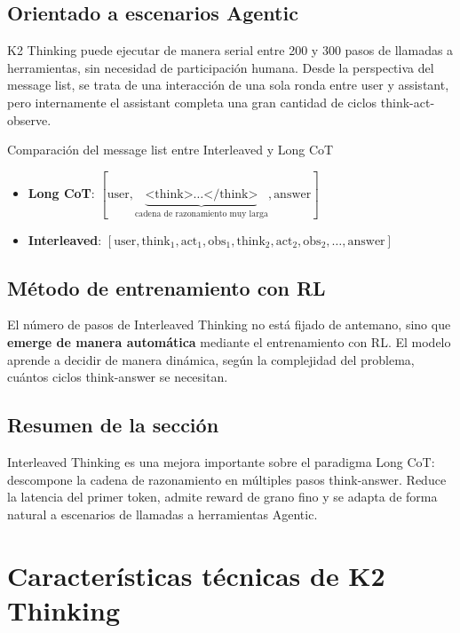\documentclass[a4paper]{article}
\begin{document}
\subsection{Orientado a escenarios Agentic}

K2 Thinking puede ejecutar de manera serial entre 200 y 300 pasos de llamadas a herramientas, sin necesidad de participación humana. Desde la perspectiva del message list, se trata de una interacción de una sola ronda entre user y assistant, pero internamente el assistant completa una gran cantidad de ciclos think-act-observe.

\begin{knowledgebox}{Comparación del message list entre Interleaved y Long CoT}
\begin{itemize}
  \item \textbf{Long CoT}: $[\text{user}, \underbrace{\text{<think>}\ldots\text{</think>}}_{\text{cadena de razonamiento muy larga}}, \text{answer}]$
  \item \textbf{Interleaved}: $[\text{user}, \text{think}_1, \text{act}_1, \text{obs}_1, \text{think}_2, \text{act}_2, \text{obs}_2, \ldots, \text{answer}]$
\end{itemize}
\end{knowledgebox}

\subsection{Método de entrenamiento con RL}

El número de pasos de Interleaved Thinking no está fijado de antemano, sino que \textbf{emerge de manera automática} mediante el entrenamiento con RL. El modelo aprende a decidir de manera dinámica, según la complejidad del problema, cuántos ciclos think-answer se necesitan.

\subsection{Resumen de la sección}

Interleaved Thinking es una mejora importante sobre el paradigma Long CoT: descompone la cadena de razonamiento en múltiples pasos think-answer. Reduce la latencia del primer token, admite reward de grano fino y se adapta de forma natural a escenarios de llamadas a herramientas Agentic.
\section{Características técnicas de K2 Thinking}
\end{document}
